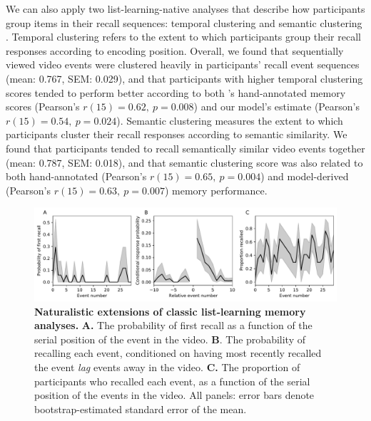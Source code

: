 \documentclass{article}
\begin{document}
We can also apply two list-learning-native analyses that describe how participants group items in their recall sequences: temporal clustering and semantic clustering \citep[][see \textit{Methods} for details]{PolyEtal09}.  Temporal clustering refers to the extent to which participants group their recall responses according to encoding position.  Overall, we found that sequentially viewed video events were clustered heavily in participants' recall event sequences (mean: 0.767, SEM: 0.029), and that participants with higher temporal clustering scores tended to perform better according to both \cite{ChenEtal17}'s hand-annotated memory scores (Pearson's $r(15) = 0.62,~p = 0.008$) and our model's estimate (Pearson's $r(15) = 0.54,~p = 0.024$).  Semantic clustering measures the extent to which participants cluster their recall responses according to semantic similarity.  We found that participants tended to recall semantically similar video events together (mean: 0.787, SEM: 0.018), and that semantic clustering score was also related to both hand-annotated  (Pearson's $r(15) = 0.65,~p = 0.004$) and model-derived (Pearson's $r(15) = 0.63,~p = 0.007$) memory performance.




\begin{figure}[tp]
  \centering
  \includegraphics[width=1\textwidth]{figs/list_learning}
  \caption{\small \textbf{Naturalistic extensions of classic list-learning memory analyses.} \textbf{A.} The probability of first recall as a function of the serial position of the event in the video. \textbf{B}.  The probability of recalling each event, conditioned on having most recently recalled the event \textit{lag} events away in the video.  \textbf{C.} The proportion of participants who recalled each event, as a function of the serial position of the events in the video.  All panels: error bars denote bootstrap-estimated standard error of the mean.}
  \label{fig:list-learning}
\end{figure}
\end{document}
